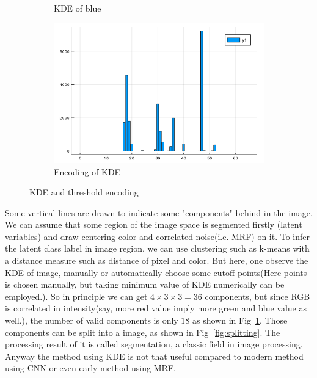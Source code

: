 \documentclass{article}
\begin{document}
\begin{figure}[htb]
\begin{subfigure}[b]{0.49\linewidth}
    \caption{KDE of blue}
  \end{subfigure}
  \begin{subfigure}[b]{0.49\linewidth}
    \includegraphics[width=\linewidth]{images/kde_code.png}
    \caption{Encoding of KDE}
  \end{subfigure}
  \caption{KDE and threshold encoding}
  \label{fig:kde}
\end{figure}

Some vertical lines are drawn to indicate some "components" behind in the image. 
We can assume that some region of the image space is segmented firstly (latent variables) 
and draw centering color and correlated noise(i.e. MRF) on it. 
To infer the latent class label in image region,
we can use clustering such as k-means with a distance measure such as distance of pixel and color. 
But here, one observe the KDE of image,
manually or automatically choose some cutoff points(Here points is chosen manually, 
but taking minimum value of KDE numerically can be employed.). 
So in principle we can get $4\times 3\times 3=36$ components, 
but since RGB is correlated in intensity(say, more red value imply more green and blue value as well.), 
the number of valid components is only $18$ as shown in Fig~\ref{fig:kde}.
Those components can be split into a image, as shown in Fig~\ref{fig:splitting}. 
The processing result of it is called segmentation, a classic field in image processing. 
Anyway the method using KDE is not that useful compared to modern method using CNN \cite{long2015fully} or 
even early method using MRF\cite{panjwani1995markov}. 
\end{document}
